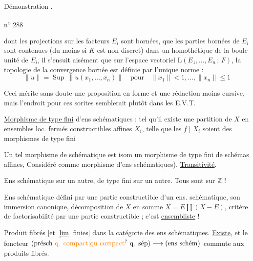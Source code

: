 Démonstration  .



\hfill n\textsuperscript{o} 288

dont les projections sur les facteurs $E_i$ sont bornées, que les parties bornées de $E_i$ sont contenues (du moins si $K$ est non discret) dans un homothétique de la boule unité de $E_i$, il s'ensuit aisément que sur l'espace vectoriel $\mathrm{L}(E_1,\ldots,E_n\,;\,F)$, la topologie de la convergence bornée est définie par l'unique norme :
\[
\lVert u\rVert=\operatorname{Sup}\ \lVert u(x_1,\ldots,x_n)\rVert\quad\text{pour}\quad\lVert x_1\rVert<1,\ldots,\lVert x_n\rVert\leq 1
\]

Ceci mérite sans doute une proposition en forme et une rédaction moins cursive, mais l'endroit pour ces sorites semblerait plutôt dans les E.V.T.


\uline{Morphisme de type fini}  d'ens schématiques : tel qu'il existe une partition de $X$ en ensembles loc. fermés constructibles affines $X_i$, telle que les $f\mid X_i$ soient des morphismes de type fini 


Un tel morphisme de  schématique est isom  un morphisme de type fini de schémas affines, Considéré comme morphisme d'ens schématiques). \uline{Transitivité}.

Ens schématique sur un autre, de type fini sur un autre. Tous sont sur $\mathbb{Z}$ !

Ens schématique défini par une partie constructible d'un ens. schématique, son immersion canonique, décomposition de $X$ en somme $X=E\amalg(X-E)$, critère de factorisabilité par une partie constructible ; c'est \uline{ensembliste} !

Produit fibrés [et $\underset{\leftarrow}{\lim}$ finies] dans la catégorie des ens schématiques. \uline{Existe}, et le foncteur  $(\text{présch }\unsure{\text{q. compact}|\text{qu compact}}\ \text{q. sép})\longrightarrow(\text{ens schém})$ commute aux produits fibrés.

